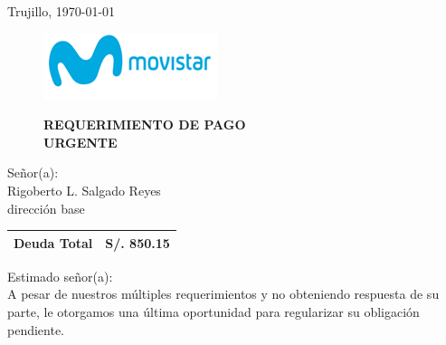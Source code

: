 %
%

\begin{flushright}
    Trujillo, \today
\end{flushright}
\vspace{-0.5cm}

\begin{figure}[h]
\begin{minipage}[b]{5.106458333cm}
\includegraphics[natwidth=5.106458333cm, natheight=1.931458333cm]{resources/business_logo.png}
\end{minipage}
\begin{minipage}[b][1.9314cm][t]{11cm}
\begin{flushright}
{\LARGE \bf REQUERIMIENTO DE PAGO\\URGENTE}
\end{flushright}
\end{minipage}
\end{figure}

\noindent
Señor(a):\\
Rigoberto L. Salgado Reyes\\
dirección base

\begin{flushright}
\bf \large
\begin{tabular}{|p{3.2cm} p{3.2cm}|}
\hline
Deuda Total & S/. 850.15 \\
\hline
\end{tabular}
\end{flushright}

\noindent
Estimado señor(a):\\
A pesar de nuestros múltiples requerimientos y no obteniendo respuesta de su parte, le otorgamos una última oportunidad para regularizar su obligación pendiente.\\

